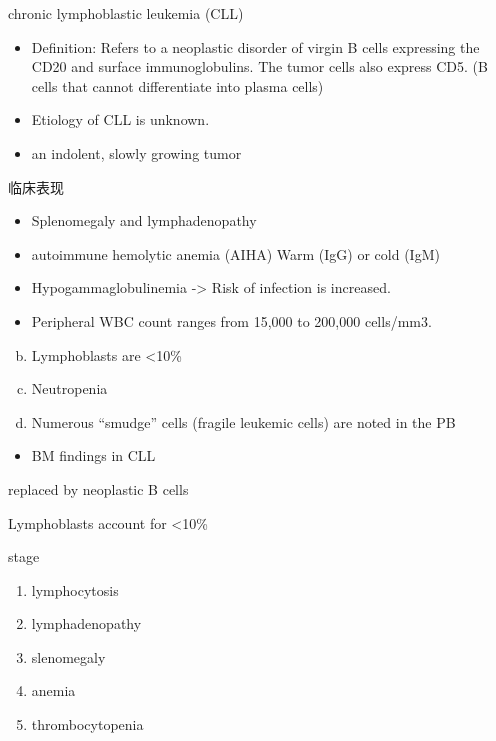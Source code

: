 \documentclass[
  ignorenonframetext,
]{beamer}
\providecommand{\tightlist}{%
  \setlength{\itemsep}{0pt}\setlength{\parskip}{0pt}}
\begin{document}
\begin{frame}
\begin{block}{chronic lymphoblastic leukemia (CLL)}
\protect\hypertarget{chronic-lymphoblastic-leukemia-cll}{}
\begin{itemize}
\item
  Definition: Refers to a neoplastic disorder of virgin B cells
  expressing the CD20 and surface immunoglobulins. The tumor cells also
  express CD5. (B cells that cannot differentiate into plasma cells)
\item
  Etiology of CLL is unknown.
\item
  an indolent, slowly growing tumor
\end{itemize}
\end{block}
\end{frame}

\begin{frame}
\begin{block}{临床表现}
\protect\hypertarget{ux4e34ux5e8aux8868ux73b0-8}{}
\begin{itemize}
\item
  Splenomegaly and lymphadenopathy
\item
  autoimmune hemolytic anemia (AIHA) Warm (IgG) or cold (IgM)
\item
  Hypogammaglobulinemia -\textgreater{} Risk of infection is increased.
\item
  Peripheral WBC count ranges from 15,000 to 200,000 cells/mm3.
\end{itemize}

\begin{enumerate}
[a.]
\setcounter{enumi}{1}
\item
  Lymphoblasts are \textless10\%
\item
  Neutropenia
\item
  Numerous ``smudge'' cells (fragile leukemic cells) are noted in the PB
\end{enumerate}

\begin{itemize}
\tightlist
\item
  BM findings in CLL
\end{itemize}

replaced by neoplastic B cells

Lymphoblasts account for \textless10\%
\end{block}
\end{frame}

\begin{frame}
\begin{block}{stage}
\protect\hypertarget{stage}{}
\begin{enumerate}
\item
  lymphocytosis
\item
  lymphadenopathy
\item
  slenomegaly
\item
  anemia
\item
  thrombocytopenia
\end{enumerate}
\end{block}
\end{frame}
\end{document}
